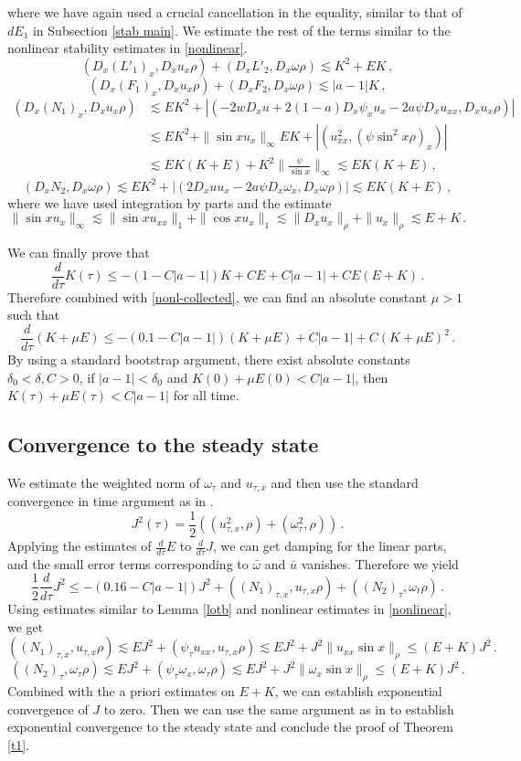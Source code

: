 \documentclass[12pt]{caltech_thesis}
\numberwithin{equation}{section}
\begin{document}
where we have again used a crucial cancellation in the equality, similar to that of $dE_1$ in Subsection \ref{stab main}. We estimate the rest of the terms similar to the nonlinear stability estimates in \eqref{nonlinear}.
$$(D_x(L'_1)_x,D_xu_x\rho)+(D_xL'_2,D_x\omega\rho)\lesssim K^2+EK\,,$$
$$(D_x(F_1)_x,D_xu_x\rho)+(D_xF_2,D_x\omega\rho)\lesssim|a-1|K\,,$$
$$\begin{aligned}(D_x(N_1)_x,D_xu_x\rho)&\lesssim EK^2+|(-2wD_xu+2(1-a)D_x\psi_x u_x-2a\psi D_xu_{xx},D_xu_x\rho)|\\&\lesssim EK^2+\|\sin xu_x\|_{\infty}EK+|(u^2_{xx},(\psi\sin^2x\rho)_x)|\\&\lesssim EK(K+E)+K^2\|\frac{\psi}{\sin x}\|_{\infty}\lesssim EK(K+E)\,,\end{aligned}$$
$$(D_xN_2,D_x\omega\rho)\lesssim EK^2+|(2D_xu u_x-2a\psi D_x\omega_{x},D_x\omega\rho)|\lesssim EK(K+E)\,,$$
where we have used integration by parts and the estimate $$\|\sin xu_x\|_{\infty}\lesssim\|\sin xu_{xx}\|_{1}+\|\cos xu_{x}\|_{1}\lesssim\|D_xu_{x}\|_{\rho}+\|u_{x}\|_{\rho}\lesssim E+K\,.$$

We can finally prove that $$\frac{d}{d\tau}K(\tau)\leq -(1-C|a-1|)K+CE+C|a-1|+CE(E+K)\,.$$
Therefore combined with \eqref{nonl-collected}, we can find an absolute constant $\mu>1$ such that $$\frac{d}{d\tau}(K+\mu E)\leq-(0.1-C|a-1|)(K+\mu E)+C|a-1|+C(K+\mu E)^2\,.$$
By using a standard bootstrap argument, there exist absolute constants $\delta_0<\delta,C>0$, if $|a-1|<\delta_0$ and $K(0)+\mu E(0)<C|a-1|$, then $K(\tau)+\mu E(\tau)<C|a-1|$ for all time.
\subsection{Convergence to the steady state}
\label{sec ct}
We estimate the weighted norm of $\omega_\tau$ and $u_{\tau,x}$ and then use the standard convergence in time argument as in \cite{chen2021finite,chen2021slightly}.
$$J^2(\tau)=\frac{1}{2}((u_{\tau,x}^2,\rho)+(\omega_{\tau}^2,\rho))\,.$$
Applying the estimates of $\frac{d}{d\tau}E$ to $\frac{d}{d\tau}J$, we can get damping for the linear parts, and the small error terms corresponding to $\bar{\omega}$ and $\bar{u}$ vanishes. Therefore we yield
$$\frac{1}{2}\frac{d}{d\tau}J^2\leq-(0.16-C|a-1|)J^2+((N_1)_{\tau,x},u_{\tau,x}\rho)+((N_2)_\tau,\omega_t\rho)\,.$$ 
 Using estimates similar to Lemma \ref{lotb} and nonlinear estimates in \eqref{nonlinear}, we get
$$((N_1)_{\tau,x},u_{\tau,x}\rho)\lesssim EJ^2+(\psi_\tau u_{xx},u_{\tau,x}\rho)\lesssim EJ^2+J^2\|u_{xx}\sin x\|_{\rho}\leq(E+K)J^2\,.$$
$$((N_2)_{\tau},\omega_\tau\rho)\lesssim EJ^2+(\psi_\tau \omega_{x},\omega_{\tau}\rho)\lesssim EJ^2+J^2\|\omega_{x}\sin x\|_{\rho}\leq(E+K)J^2\,.$$
Combined with the a priori estimates on $E+K$, we can establish exponential convergence of $J$ to zero. Then we can use the same argument as in \cite{chen2021finite,chen2021slightly} to establish exponential convergence to the steady state and conclude the proof of Theorem \ref{t1}.
\end{document}
